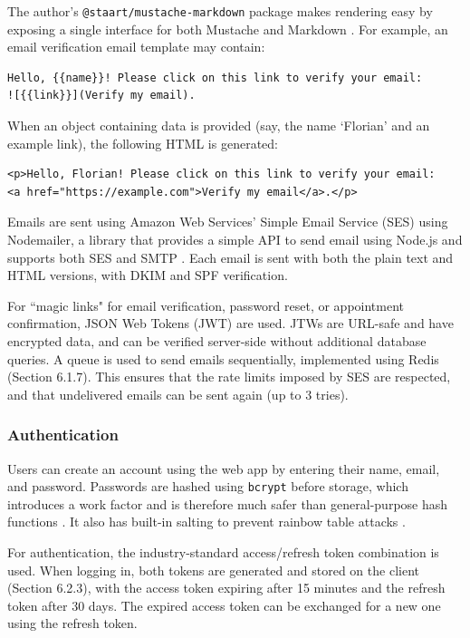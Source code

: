 \documentclass{article}
\begin{document}
The author's \texttt{@staart/mustache-markdown} package makes rendering easy by exposing a single interface for both Mustache and Markdown \cite{noauthor_staart/mustache-markdown_nodate}. For example, an email verification email template may contain:

\begin{verbatim}
Hello, {{name}}! Please click on this link to verify your email:
![{{link}}](Verify my email).
\end{verbatim}

When an object containing data is provided (say, the name `Florian' and an example link), the following HTML is generated:

\begin{verbatim}
<p>Hello, Florian! Please click on this link to verify your email:
<a href="https://example.com">Verify my email</a>.</p>
\end{verbatim}

Emails are sent using Amazon Web Services' Simple Email Service (SES) using Nodemailer, a library that provides a simple API to send email using Node.js and supports both SES and SMTP \cite{noauthor_nodemailer_nodate}. Each email is sent with both the plain text and HTML versions, with DKIM and SPF verification.

For ``magic links" for email verification, password reset, or appointment confirmation, JSON Web Tokens (JWT) are used. JTWs are URL-safe and have encrypted data, and can be verified server-side without additional database queries. A queue is used to send emails sequentially, implemented using Redis (Section 6.1.7). This ensures that the rate limits imposed by SES are respected, and that undelivered emails can be sent again (up to 3 tries).

\subsubsection{Authentication}

Users can create an account using the web app by entering their name, email, and password. Passwords are hashed using \texttt{bcrypt} before storage, which introduces a work factor and is therefore much safer than general-purpose hash functions \cite{provos_future-adaptive_1999}. It also has built-in salting to prevent rainbow table attacks \cite{noauthor_how_2010}.

For authentication, the industry-standard access/refresh token combination is used. When logging in, both tokens are generated and stored on the client (Section 6.2.3), with the access token expiring after 15 minutes and the refresh token after 30 days. The expired access token can be exchanged for a new one using the refresh token.
\end{document}
